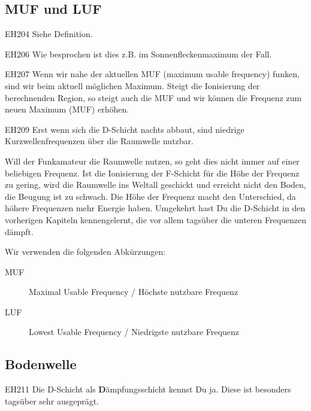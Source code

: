 \subsection{MUF und LUF}

\begin{sol}{EH204}
 Siehe Definition.
\end{sol}

\begin{sol}{EH206}
 Wie besprochen ist dies z.B. im Sonnenfleckenmaximum der Fall. 
\end{sol}

\begin{sol}{EH207}
 Wenn wir nahe der aktuellen MUF (maximum usable frequency) funken, sind wir beim aktuell möglichen Maximum. Steigt die Ionisierung der berechnenden Region, so steigt auch die MUF und wir können die Frequenz zum neuen Maximum (MUF) erhöhen.
\end{sol}

\begin{sol}{EH209}
 Erst wenn sich die D-Schicht nachts abbaut, sind niedrige Kurzwellenfrequenzen über die Raumwelle nutzbar.
\end{sol}

\begin{ohmchapter}
    Will der Funkamateur die Raumwelle nutzen, so geht dies nicht immer auf einer beliebigen Frequenz. 
    Ist die Ionisierung der F-Schicht für die Höhe der Frequenz zu gering, wird die Raumwelle ins Weltall geschickt und erreicht nicht den Boden, die Beugung ist zu schwach. Die Höhe der Frequenz macht den Unterschied, da höhere Frequenzen mehr Energie haben.
    Umgekehrt hast Du die D-Schicht in den vorherigen Kapiteln kennengelernt, die vor allem tagsüber die unteren Frequenzen dämpft.

    Wir verwenden die folgenden Abkürzungen:
    \begin{description}
        \item[MUF] Maximal Usable Frequency / Höchste nutzbare Frequenz
        \item[LUF] Lowest Usable Frequency / Niedrigste nutzbare Frequenz
    \end{description}
\end{ohmchapter}  
\subsection{Bodenwelle}

\begin{sol}{EH211}
Die D-Schicht als \textbf{D}ämpfungsschicht kennst Du ja. Diese ist besonders tagsüber sehr ausgeprägt.
\end{sol}

